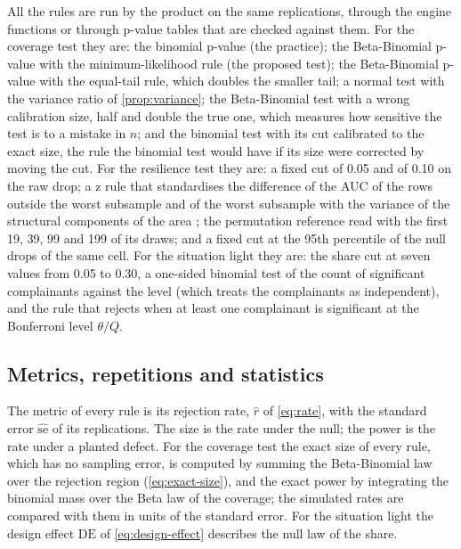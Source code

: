 All the rules are run by the product on the same replications, through the engine functions or through p-value tables that are checked against them. For the coverage test they are: the binomial p-value (the practice); the Beta-Binomial p-value with the minimum-likelihood rule (the proposed test); the Beta-Binomial p-value with the equal-tail rule, which doubles the smaller tail; a normal test with the variance ratio of \cref{prop:variance}; the Beta-Binomial test with a wrong calibration size, half and double the true one, which measures how sensitive the test is to a mistake in $n$; and the binomial test with its cut calibrated to the exact size, the rule the binomial test would have if its size were corrected by moving the cut. For the resilience test they are: a fixed cut of 0.05 and of 0.10 on the raw drop; a z rule that standardises the difference of the AUC of the rows outside the worst subsample and of the worst subsample with the variance of the structural components of the area \citep{delong1988}; the permutation reference read with the first 19, 39, 99 and 199 of its draws; and a fixed cut at the 95th percentile of the null drops of the same cell. For the situation light they are: the share cut at seven values from 0.05 to 0.30, a one-sided binomial test of the count of significant complainants against the level (which treats the complainants as independent), and the rule that rejects when at least one complainant is significant at the Bonferroni level $\theta/Q$.

\subsection{Metrics, repetitions and statistics}

The metric of every rule is its rejection rate, $\hat r$ of \cref{eq:rate}, with the standard error $\widehat{\mathrm{se}}$ of its replications. The size is the rate under the null; the power is the rate under a planted defect. For the coverage test the exact size of every rule, which has no sampling error, is computed by summing the Beta-Binomial law over the rejection region (\cref{eq:exact-size}), and the exact power by integrating the binomial mass over the Beta law of the coverage; the simulated rates are compared with them in units of the standard error. For the situation light the design effect $\mathrm{DE}$ of \cref{eq:design-effect} describes the null law of the share.

